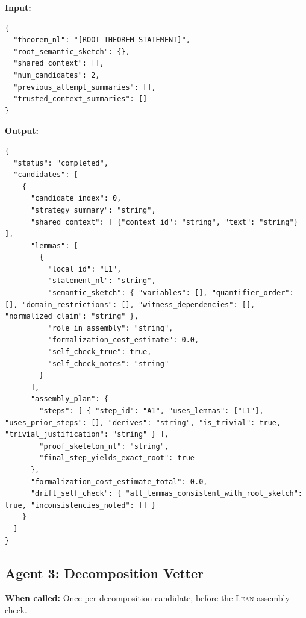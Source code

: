 \documentclass[11pt,a4paper]{article}
\newcommand{\Lean}{\textsc{Lean}}
\begin{document}
\textbf{Input:}
\begin{lstlisting}
{
  "theorem_nl": "[ROOT THEOREM STATEMENT]",
  "root_semantic_sketch": {},
  "shared_context": [],
  "num_candidates": 2,
  "previous_attempt_summaries": [],
  "trusted_context_summaries": []
}
\end{lstlisting}

\textbf{Output:}
\begin{lstlisting}
{
  "status": "completed",
  "candidates": [
    {
      "candidate_index": 0,
      "strategy_summary": "string",
      "shared_context": [ {"context_id": "string", "text": "string"} ],
      "lemmas": [
        {
          "local_id": "L1",
          "statement_nl": "string",
          "semantic_sketch": { "variables": [], "quantifier_order": [], "domain_restrictions": [], "witness_dependencies": [], "normalized_claim": "string" },
          "role_in_assembly": "string",
          "formalization_cost_estimate": 0.0,
          "self_check_true": true,
          "self_check_notes": "string"
        }
      ],
      "assembly_plan": {
        "steps": [ { "step_id": "A1", "uses_lemmas": ["L1"], "uses_prior_steps": [], "derives": "string", "is_trivial": true, "trivial_justification": "string" } ],
        "proof_skeleton_nl": "string",
        "final_step_yields_exact_root": true
      },
      "formalization_cost_estimate_total": 0.0,
      "drift_self_check": { "all_lemmas_consistent_with_root_sketch": true, "inconsistencies_noted": [] }
    }
  ]
}
\end{lstlisting}

\subsection{Agent 3: Decomposition Vetter}

\textbf{When called:} Once per decomposition candidate, before the \Lean{} assembly check.
\end{document}
